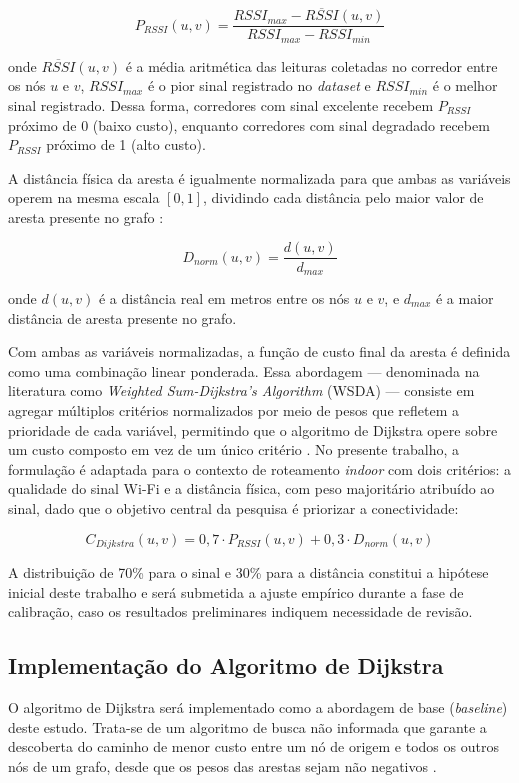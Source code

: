 \documentclass[
    12pt,                %
    openright,           %
    oneside,             %
    a4paper,             %
    english,             %
    brazil               %
]{abntex2}
\begin{document}
$$ P_{RSSI}(u,v) = \frac{RSSI_{max} - \overline{RSSI}(u,v)}{RSSI_{max} - RSSI_{min}} $$

onde $\overline{RSSI}(u,v)$ é a média aritmética das leituras coletadas no corredor
entre os nós $u$ e $v$, $RSSI_{max}$ é o pior sinal registrado no \textit{dataset} e
$RSSI_{min}$ é o melhor sinal registrado. Dessa forma, corredores com sinal excelente
recebem $P_{RSSI}$ próximo de 0 (baixo custo), enquanto corredores com sinal degradado
recebem $P_{RSSI}$ próximo de 1 (alto custo).

A distância física da aresta é igualmente normalizada para que ambas as variáveis
operem na mesma escala $[0, 1]$, dividindo cada distância pelo maior valor de
aresta presente no grafo \cite{Han2011}:

$$ D_{norm}(u,v) = \frac{d(u,v)}{d_{max}} $$

onde $d(u,v)$ é a distância real em metros entre os nós $u$ e $v$, e $d_{max}$ é a
maior distância de aresta presente no grafo.

Com ambas as variáveis normalizadas, a função de custo final da aresta é definida
como uma combinação linear ponderada. Essa abordagem --- denominada na literatura
como \textit{Weighted Sum-Dijkstra's Algorithm} (WSDA) --- consiste em agregar
múltiplos critérios normalizados por meio de pesos que refletem a prioridade de
cada variável, permitindo que o algoritmo de Dijkstra opere sobre um custo
composto em vez de um único critério \cite{Hua2018}. No presente trabalho, a
formulação é adaptada para o contexto de roteamento \textit{indoor} com dois
critérios: a qualidade do sinal Wi-Fi e a distância física, com peso majoritário
atribuído ao sinal, dado que o objetivo central da pesquisa é priorizar a
conectividade:

$$ C_{Dijkstra}(u,v) = 0{,}7 \cdot P_{RSSI}(u,v) + 0{,}3 \cdot D_{norm}(u,v) $$

A distribuição de 70\% para o sinal e 30\% para a distância constitui a hipótese
inicial deste trabalho e será submetida a ajuste empírico durante a fase de
calibração, caso os resultados preliminares indiquem necessidade de revisão.

\subsection{Implementação do Algoritmo de Dijkstra}

O algoritmo de Dijkstra será implementado como a abordagem de base
(\textit{baseline}) deste estudo. Trata-se de um algoritmo de busca não informada que garante a descoberta 
do caminho de menor custo entre um nó de origem e todos os outros nós de 
um grafo, desde que os pesos das arestas sejam não negativos \cite{Cormen2009}.
\end{document}
